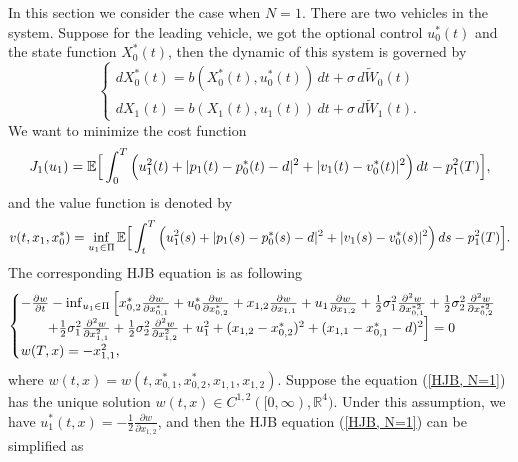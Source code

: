 \documentclass{article}
\begin{document}
In this section we consider the case when $N = 1$. There are two vehicles in the system. Suppose for the leading vehicle, we got the optional control $u_{0}^{*} (t)$ and the state function $X_{0}^{*} (t)$, then the dynamic of this system is governed by
\begin{equation}
    \begin{cases}
   d X_{0}^{*}(t) = b(X_{0}^{*}(t), u_{0}^{*}(t)) \, d t + \sigma \, d \widetilde{W}_{0}(t)  \\
   d X_{1}(t) = b(X_{1} (t), u_{1} (t)) \, d t + \sigma \, d \widetilde{W}_{1}(t).
   \end{cases}
\end{equation}
We want to minimize the cost function
\begin{equation*}
    J_{1} (u_{1}) = \mathbb{E} \Big{[} \int_{0}^{T} \Big{(} u_{1}^{2}(t) + |p_{1}(t) - p_{0}^{*}(t) - d|^{2} + |v_{1}(t) - v_{0}^{*}(t)|^{2} \Big{)} \, d t - p_{1}^{2}(T) \Big{]},
\end{equation*}
and the value function is denoted by
\begin{equation*}
    v(t, x_{1}, x_{0}^{*}) = \inf_{u_{1} \in \Pi} \mathbb{E} \Big{[} \int_{t}^{T} \Big{(} u_{1}^{2}(s) + |p_{1}(s) - p_{0}^{*}(s) - d|^{2} + |v_{1}(s) - v_{0}^{*}(s)|^{2} \Big{)} \, d s - p_{1}^{2}(T) \Big{]}.
\end{equation*}
The corresponding HJB equation is as following
\begin{equation} \label{HJB, N=1}
    \begin{cases}
   - \frac{\partial w}{\partial t} - \inf_{u_{1} \in \Pi} \Big{[} x_{0,2}^{*} \frac{\partial w}{\partial x_{0, 1}^{*}} + u_{0}^{*} \frac{\partial w}{\partial x_{0, 2}^{*}} + x_{1,2} \frac{\partial w}{\partial x_{1, 1}} + u_{1} \frac{\partial w}{\partial x_{1, 2}} + \frac{1}{2} \sigma_{1}^{2} \frac{\partial^{2} w}{\partial x_{0, 1}^{* 2}} + \frac{1}{2} \sigma_{2}^{2} \frac{\partial^{2} w}{\partial x_{0, 2}^{* 2}}  \\
   \qquad + \frac{1}{2} \sigma_{1}^{2} \frac{\partial^{2} w}{\partial x_{1, 1}^{2}} + \frac{1}{2} \sigma_{2}^{2} \frac{\partial^{2} w}{\partial x_{1, 2}^{2}} + u_{1}^{2} + (x_{1, 2} - x_{0, 2}^{*})^{2} + (x_{1, 1} - x_{0, 1}^{*} - d)^{2} \Big{]}   = 0  \\
   w(T, x) = - x_{1, 1}^{2},
   \end{cases}
\end{equation}
where $w(t, x) = w(t, x_{0, 1}^{*}, x_{0, 2}^{*}, x_{1, 1}, x_{1, 2})$. Suppose the equation (\ref{HJB, N=1}) has the unique solution $w(t,x) \in C^{1,2}([0, \infty), \mathbb{R}^{4})$. Under this assumption, we have $u_{1}^{*}(t, x) = - \frac{1}{2} \frac{\partial w}{\partial x_{1, 2}}$, and then the HJB equation (\ref{HJB, N=1}) can be simplified as
\end{document}
